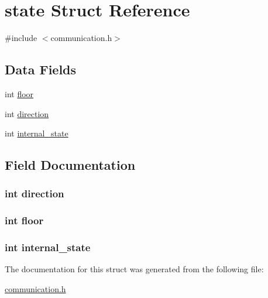 \hypertarget{structstate}{\section{state Struct Reference}
\label{structstate}
}


{\ttfamily \#include $<$communication.\-h$>$}

\subsection*{Data Fields}
\begin{DoxyCompactItemize}
\item 
int \hyperlink{structstate_aae85c3a510bb6ec64e3569ede2518893}{floor}
\item 
int \hyperlink{structstate_a886d551d5381dc3e53f17825ffc51641}{direction}
\item 
int \hyperlink{structstate_af6c594abce4c058d139513726a24c2a7}{internal\-\_\-state}
\end{DoxyCompactItemize}


\subsection{Field Documentation}
\hypertarget{structstate_a886d551d5381dc3e53f17825ffc51641}{
\subsubsection[{direction}]{\setlength{\rightskip}{0pt plus 5cm}int direction}}\label{structstate_a886d551d5381dc3e53f17825ffc51641}
\hypertarget{structstate_aae85c3a510bb6ec64e3569ede2518893}{
\subsubsection[{floor}]{\setlength{\rightskip}{0pt plus 5cm}int floor}}\label{structstate_aae85c3a510bb6ec64e3569ede2518893}
\hypertarget{structstate_af6c594abce4c058d139513726a24c2a7}{
\subsubsection[{internal\-\_\-state}]{\setlength{\rightskip}{0pt plus 5cm}int internal\-\_\-state}}\label{structstate_af6c594abce4c058d139513726a24c2a7}


The documentation for this struct was generated from the following file\-:\begin{DoxyCompactItemize}
\item 
\hyperlink{communication_8h}{communication.\-h}\end{DoxyCompactItemize}
